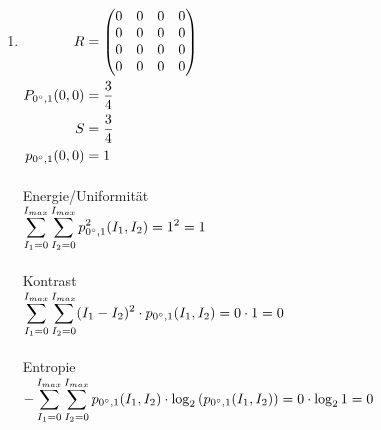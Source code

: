 \begin{enumerate}[I]
	\setlength\itemsep{2em}
	\item $\begin{aligned}[t]
			      R                   & = \begin{pmatrix}
				                              0 & 0 & 0 & 0 \\
				                              0 & 0 & 0 & 0 \\
				                              0 & 0 & 0 & 0 \\
				                              0 & 0 & 0 & 0 \\
			                              \end{pmatrix} \\
			      P_{0\degree,1}(0,0) & = \frac{3}{4}    \\
			      S                   & = \frac{3}{4}    \\
			      p_{0\degree,1}(0,0) & = 1
		      \end{aligned}$\\\\

	      Energie/Uniformität\\
	      $\begin{aligned}[t]
			      \sum_{I_1=0}^{I_{max}}\sum_{I_2=0}^{I_{max}} p^2_{0\degree,1}(I_1,I_2)
			      = 1^2 = 1 \\
		      \end{aligned}$\\\\

	      Kontrast\\
	      $\begin{aligned}[t]
			      \sum_{I_1=0}^{I_{max}}\sum_{I_2=0}^{I_{max}} (I_1-I_2)^2 \cdot p_{0\degree,1}(I_1,I_2)
			      =0 \cdot 1 = 0 \\
		      \end{aligned}$\\\\

	      Entropie\\
	      $\begin{aligned}[t]
			      -  \sum_{I_1=0}^{I_{max}}\sum_{I_2=0}^{I_{max}}  p_{0\degree,1}(I_1,I_2) \cdot \log_2 \left( p_{0\degree,1}(I_1,I_2) \right)
			      =0 \cdot \log_2{1} = 0 \\
		      \end{aligned}$\\\\


\end{enumerate}
